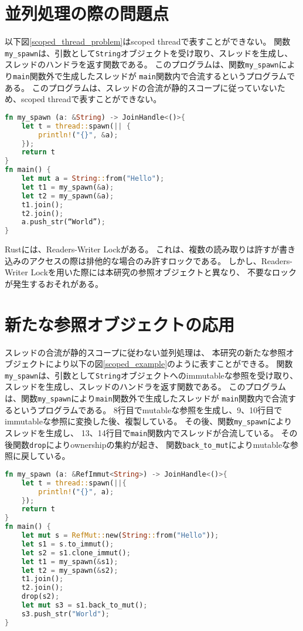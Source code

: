 \documentclass{sumiilab-paper}
\theoremstyle{mystyle}
\numberwithin{definition}{chapter} %
\begin{document}
\section{並列処理の際の問題点}
以下図\ref{scoped_thread_problem}はscoped threadで表すことができない。
関数\texttt{my\_spawn}は、引数として\texttt{String}オブジェクトを受け取り、スレッドを生成し、
スレッドのハンドラを返す関数である。
このプログラムは、関数\texttt{my\_spawn}により\texttt{main}関数外で生成したスレッドが
\texttt{main}関数内で合流するというプログラムである。
このプログラムは、スレッドの合流が静的スコープに従っていないため、scoped threadで表すことができない。
\begin{lstlisting}[language=Rust, caption=scoped threadで表せない例, 
  label=scoped_thread_problem, captionpos=b]
fn my_spawn (a: &String) -> JoinHandle<()>{
    let t = thread::spawn(|| {
        println!("{}", &a);
    });
    return t
}
fn main() {
    let mut a = String::from("Hello");
    let t1 = my_spawn(&a);
    let t2 = my_spawn(&a);
    t1.join();
    t2.join();
    a.push_str(“World”);
}
\end{lstlisting}
Rustには、Readers-Writer Lock\cite{DBLP:journals/cacm/CouroisHP71}がある。
これは、複数の読み取りは許すが書き込みのアクセスの際は排他的な場合のみ許すロックである。
しかし、Readers-Writer Lockを用いた際には本研究の参照オブジェクトと異なり、
不要なロックが発生するおそれがある。


\section{新たな参照オブジェクトの応用}
スレッドの合流が静的スコープに従わない並列処理は、
本研究の新たな参照オブジェクトにより以下の図\ref{scoped_example}のように表すことができる。
関数\texttt{my\_spawn}は、引数として\texttt{String}オブジェクトへのimmutableな参照を受け取り、
スレッドを生成し、スレッドのハンドラを返す関数である。
このプログラムは、関数\texttt{my\_spawn}により\texttt{main}関数外で生成したスレッドが
\texttt{main}関数内で合流するというプログラムである。
8行目でmutableな参照を生成し、9、10行目でimmutableな参照に変換した後、複製している。
その後、関数\texttt{my\_spawn}によりスレッドを生成し、
13、14行目で\texttt{main}関数内でスレッドが合流している。
その後関数\texttt{drop}によりownershipの集約が起き、
関数\texttt{back\_to\_mut}によりmutableな参照に戻している。
\begin{lstlisting}[language=Rust, caption=新たな参照オブジェクトを用いた並列処理の例, 
  label=scoped_example, captionpos=b]
fn my_spawn (a: &RefImmut<String>) -> JoinHandle<()>{
    let t = thread::spawn(||{
        println!("{}", a);
    });
    return t
}
fn main() {
    let mut s = RefMut::new(String::from("Hello"));
    let s1 = s.to_immut();
    let s2 = s1.clone_immut(); 
    let t1 = my_spawn(&s1);
    let t2 = my_spawn(&s2); 
    t1.join();
    t2.join();
    drop(s2);
    let mut s3 = s1.back_to_mut();
    s3.push_str("World");
}
\end{lstlisting}
\end{document}

